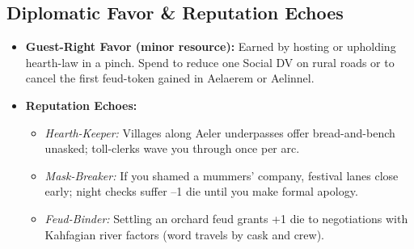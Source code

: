 \subsection*{Diplomatic Favor \& Reputation Echoes}
\begin{itemize}
  \item \textbf{Guest-Right Favor (minor resource):} Earned by hosting or upholding hearth-law in a pinch. Spend to reduce one Social DV on rural roads or to cancel the first feud-token gained in Aelaerem or Aelinnel.
  \item \textbf{Reputation Echoes:} 
    \begin{itemize}
      \item \emph{Hearth-Keeper:} Villages along Aeler underpasses offer bread-and-bench unasked; toll-clerks wave you through once per arc.
      \item \emph{Mask-Breaker:} If you shamed a mummers’ company, festival lanes close early; night checks suffer --1 die until you make formal apology.
      \item \emph{Feud-Binder:} Settling an orchard feud grants +1 die to negotiations with Kahfagian river factors (word travels by cask and crew).
    \end{itemize}
\end{itemize}